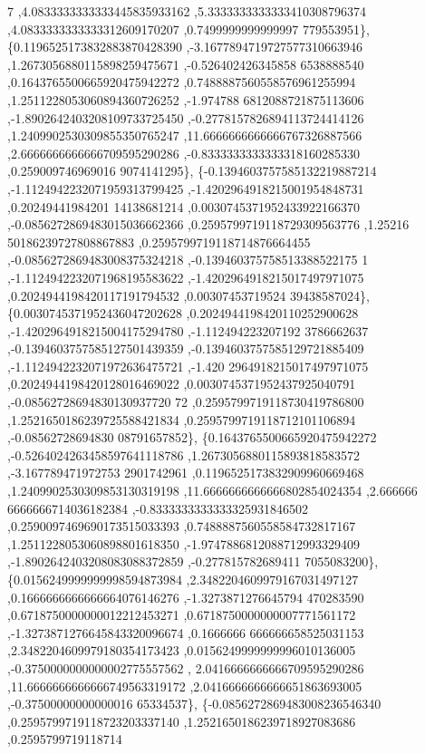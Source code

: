 \begin{DoxyCode}
      7 ,4.0833333333333445835933162 ,5.3333333333333410308796374 ,4.0833333333333312609170207 ,0.7499999999999997
      779553951\},
\{0.1196525173832883870428390 ,-3.1677894719727577310663946 ,1.2673056880115898259475671 ,-0.526402426345858
      6538888540 ,0.1643765500665920475942272 ,0.7488887560558576961255994 ,1.2511228053060894360726252 ,-1.974788
      6812088721875113606 ,-1.8902642403208109733725450 ,-0.2778157826894113724414126 ,1.2409902530309855350765247
       ,11.6666666666666767326887566 ,2.6666666666666709595290286 ,-0.8333333333333318160285330 ,0.259009746969016
      9074141295\},
\{-0.1394603757585132219887214 ,-1.1124942232071959313799425 ,-1.4202964918215001954848731 ,0.20249441984201
      14138681214 ,0.0030745371952433922166370 ,-0.0856272869483015036662366 ,0.2595799719118729309563776 ,1.25216
      50186239727808867883 ,0.2595799719118714876664455 ,-0.0856272869483008375324218 ,-0.139460375758513388522175
      1 ,-1.1124942232071968195583622 ,-1.4202964918215017497971075 ,0.2024944198420117191794532 ,0.00307453719524
      39438587024\},
\{0.0030745371952436047202628 ,0.2024944198420110252900628 ,-1.4202964918215004175294780 ,-1.112494223207192
      3786662637 ,-0.1394603757585127501439359 ,-0.1394603757585129721885409 ,-1.1124942232071972636475721 ,-1.420
      2964918215017497971075 ,0.2024944198420128016469022 ,0.0030745371952437925040791 ,-0.08562728694830130937720
      72 ,0.2595799719118730419786800 ,1.2521650186239725588421834 ,0.2595799719118712101106894 ,-0.08562728694830
      08791657852\},
\{0.1643765500665920475942272 ,-0.5264024263458597641118786 ,1.2673056880115893818583572 ,-3.167789471972753
      2901742961 ,0.1196525173832909960669468 ,1.2409902530309853130319198 ,11.6666666666666802854024354 ,2.666666
      6666666714036182384 ,-0.8333333333333325931846502 ,0.2590097469690173515033393 ,0.7488887560558584732817167 
      ,1.2511228053060898801618350 ,-1.9747886812088712993329409 ,-1.8902642403208083088372859 ,-0.277815782689411
      7055083200\},
\{0.0156249999999998594873984 ,2.3482204609979167031497127 ,0.1666666666666664076146276 ,-1.3273871276645794
      470283590 ,0.6718750000000012212453271 ,0.6718750000000007771561172 ,-1.3273871276645843320096674 ,0.1666666
      666666658525031153 ,2.3482204609979180354173423 ,0.0156249999999996010136005 ,-0.3750000000000002775557562 ,
      2.0416666666666709595290286 ,11.6666666666666749563319172 ,2.0416666666666651863693005 ,-0.37500000000000016
      65334537\},
\{-0.0856272869483008236546340 ,0.2595799719118723203337140 ,1.2521650186239718927083686 ,0.2595799719118714

\end{DoxyCode}
